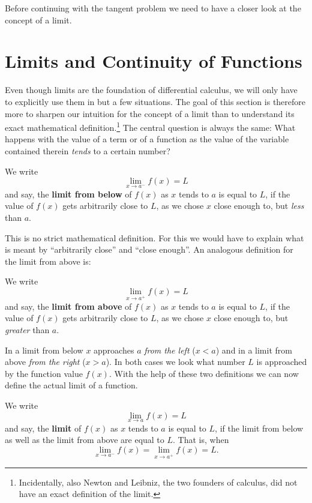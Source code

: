 \documentclass[12pt,eng]{skript_ogg}
\begin{document}
Before continuing with the tangent problem we need to have a closer look at the concept of a limit.
 
\newpage

\section{Limits and Continuity of Functions}
Even though limits are the foundation of differential calculus, we will only have to explicitly use them in but a few situations. The goal of this section is therefore more to sharpen our intuition for the concept of a limit than to understand its exact mathematical definition.\footnote{Incidentally, also Newton and Leibniz, the two founders of calculus, did not have an exact definition of the limit.} The central question is always the same: What happens with the value of a term or of a function as the value of the variable contained therein \emph{tends} to a certain number?

\begin{defn}
We write
\[\lim_{x\rightarrow a^{-}}f(x)=L\]
and say, the \textbf{limit from below} of $f(x)$ as $x$ tends to $a$ is equal to $L$, if the value of $f(x)$ gets arbitrarily close to $L$, as we chose $x$ close enough to, but \emph{less} than $a$. 
\end{defn}

This is no strict mathematical definition. For this we would have to explain what is meant by ``arbitrarily close'' and ``close enough''. An analogous definition for the limit from above is:
\begin{defn}
We write
\[\lim_{x\rightarrow a^{+}}f(x)=L\]
and say, the \textbf{limit from above} of $f(x)$ as $x$ tends to $a$ is equal to $L$, if the value of $f(x)$ gets arbitrarily close to $L$, as we chose $x$ close enough to, but \emph{greater} than $a$.
\end{defn}

In a limit from below $x$ approaches $a$ \emph{from the left} ($x<a$) and in a limit from above \emph{from the right} ($x>a$). In both cases we look what number $L$ is approached by the function value $f(x)$. With the help of these two definitions we can now define the actual limit of a function.

\begin{defn}[Limit]
We write
\[\lim_{x\rightarrow a}f(x)=L\]
and say, the \textbf{limit} of $f(x)$ as $x$ tends to $a$ is equal to $L$, if the limit from below as well as the limit from above are equal to $L$. That is, when
\[\lim_{x\rightarrow a^{-}}f(x)=\lim_{x\rightarrow a^{+}}f(x)=L.\]
\end{defn}
\end{document}
